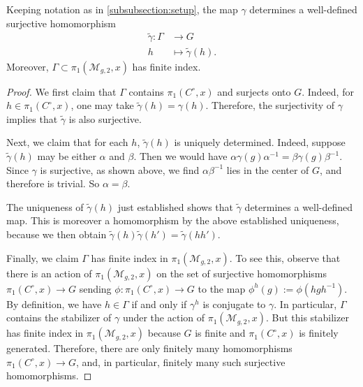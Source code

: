 \begin{lemma}
\notready
	\label{lemma:center-free-group}
	Keeping notation as in \autoref{subsubsection:setup},
	the map $\gamma$ determines a well-defined surjective homomorphism
	\begin{align*}
		\widetilde{\gamma}: \Gamma  & \rightarrow G\\
		h & \mapsto \widetilde{\gamma}(h).
	\end{align*}
	Moreover, $\Gamma \subset\pi_1(\mathscr{M}_{g,2},x)$ has finite index.
\end{lemma}
\begin{proof}
	We first claim that $\Gamma$ contains $\pi_1(C^\circ, x)$ and surjects
	onto $G$. Indeed, for $h\in
\pi_1(C^\circ, x)$, one may take $\widetilde{\gamma}(h)=\gamma(h)$.
Therefore, the surjectivity of $\gamma$ implies that $\widetilde{\gamma}$ is
also surjective.

	Next, we claim that for each $h$, $\widetilde{\gamma}(h)$ is uniquely determined.
	Indeed, suppose $\widetilde{\gamma}(h)$ may be either
	$\alpha$ and $\beta$. Then we would have $\alpha \gamma(g) \alpha^{-1} =
	\beta \gamma(g) \beta^{-1}$.
	Since $\gamma$ is surjective, as shown above, we find $\alpha
	\beta^{-1}$ lies in the center of $G$, and therefore is trivial. So
	$\alpha = \beta$.

	The uniqueness of $\widetilde{\gamma}(h)$ just established shows that $\widetilde{\gamma}$ determines a well-defined map.
This is moreover a homomorphism by the above established uniqueness, because we
then obtain $\widetilde{\gamma}(h) \widetilde{\gamma}(h') =
\widetilde{\gamma}(hh')$.

Finally, we claim $\Gamma$ has finite index in $\pi_1(\mathscr{M}_{g,2}, x)$.
To see this, observe that there is an action of $\pi_1(\mathscr{M}_{g,2}, x)$
on the set of surjective homomorphisms $\pi_1(C^{\circ},x) \to G$ sending $\phi:
\pi_1(C^{\circ},x) \to G$ to the map $\phi^h(g) := \phi(hgh^{-1})$.
By definition, we have $h \in \Gamma$ if and only if $\gamma^h$ is conjugate to $\gamma$.
In particular, $\Gamma$ contains the stabilizer of $\gamma$ under the action of
$\pi_1(\mathscr{M}_{g,2}, x)$.
But this stabilizer has finite index in
$\pi_1(\mathscr{M}_{g,2}, x)$ because
$G$ is finite and $\pi_1(C^\circ, x)$ is finitely generated.
Therefore,
there are only
finitely many
homomorphisms $\pi_1(C^\circ, x) \to G$,
and, in particular, finitely many such surjective homomorphisms.

\end{proof}

